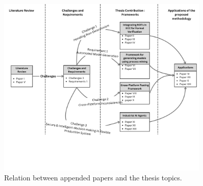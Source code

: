 \begin{figure}[htbp]
    \centering
    \includegraphics[width=0.9\textwidth]{chapters/images/chapter1/Literature Review.png}
    \caption{Relation between appended papers and the thesis topics.}
    \label{fig:ch1:paper_relationship}
\end{figure}


